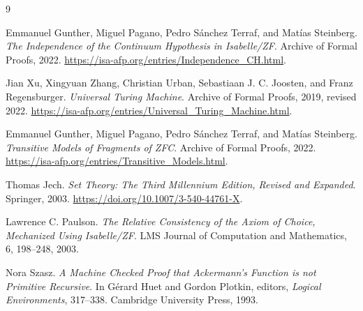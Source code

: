 \documentclass[11pt,a4paper]{article}
\begin{document}
\begin{thebibliography}{9}

Emmanuel Gunther, Miguel Pagano, Pedro S\'anchez Terraf, and Mat\'ias Steinberg.
\emph{The Independence of the Continuum Hypothesis in Isabelle/ZF}.
Archive of Formal Proofs, 2022.
\url{https://isa-afp.org/entries/Independence_CH.html}.

Jian Xu, Xingyuan Zhang, Christian Urban, Sebastiaan J. C. Joosten, and
Franz Regensburger.
\emph{Universal Turing Machine}.
Archive of Formal Proofs, 2019, revised 2022.
\url{https://isa-afp.org/entries/Universal_Turing_Machine.html}.

Emmanuel Gunther, Miguel Pagano, Pedro S\'anchez Terraf, and Mat\'ias Steinberg.
\emph{Transitive Models of Fragments of ZFC}.
Archive of Formal Proofs, 2022.
\url{https://isa-afp.org/entries/Transitive_Models.html}.

Thomas Jech.
\emph{Set Theory: The Third Millennium Edition, Revised and Expanded}.
Springer, 2003.
\url{https://doi.org/10.1007/3-540-44761-X}.

Lawrence C. Paulson.
\emph{The Relative Consistency of the Axiom of Choice, Mechanized Using
Isabelle/ZF}.
LMS Journal of Computation and Mathematics, 6, 198--248, 2003.

Nora Szasz.
\emph{A Machine Checked Proof that Ackermann's Function is not Primitive
Recursive}.
In G\'erard Huet and Gordon Plotkin, editors, \emph{Logical Environments},
317--338. Cambridge University Press, 1993.

\end{thebibliography}
\end{document}
